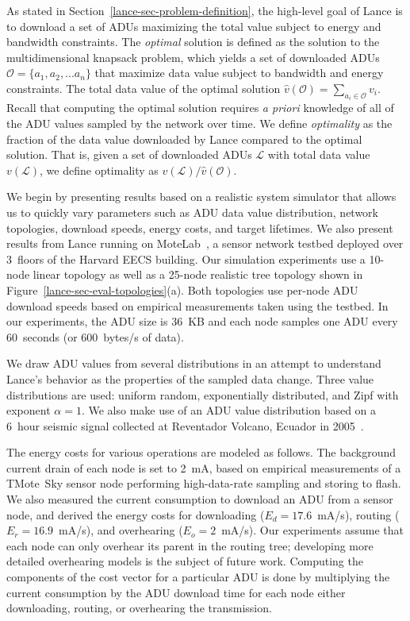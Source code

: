As stated in Section~\ref{lance-sec-problem-definition}, the high-level goal
of Lance is to download a set of ADUs maximizing the total value subject to
energy and bandwidth constraints. The {\em optimal} solution is defined as
the solution to the multidimensional knapsack problem, which yields a set of
downloaded ADUs $\mathcal{O} = \{a_1, a_2, ...  a_n\}$ that maximize data
value subject to bandwidth and energy constraints. The total data value of
the optimal solution $\hat{v}(\mathcal{O}) = \sum_{a_i \in \mathcal{O}} v_i$.
Recall that computing the optimal solution requires {\em a priori} knowledge
of all of the ADU values sampled by the network over time.  We define {\em
optimality} as the fraction of the data value downloaded by Lance compared to
the optimal solution. That is, given a set of downloaded ADUs $\mathcal{L}$
with total data value $v(\mathcal{L})$, we define optimality as
$v(\mathcal{L}) / \hat{v}(\mathcal{O})$.

We begin by presenting results based on a realistic system simulator that
allows us to quickly vary parameters such as ADU data value distribution,
network topologies, download speeds, energy costs, and target lifetimes. We
also present results from Lance running on MoteLab~\cite{motelab}, a sensor
network testbed deployed over 3~floors of the Harvard EECS building.  Our
simulation experiments use a 10-node linear topology as well as a 25-node
realistic tree topology shown in Figure~\ref{lance-sec-eval-topologies}(a).
Both topologies use per-node ADU download speeds based on empirical
measurements taken using the testbed.  In our experiments, the ADU size is
36~KB and each node samples one ADU every 60~seconds (or 600~bytes/s of
data).

We draw ADU values from several distributions in an attempt to understand
Lance's behavior as the properties of the sampled data change.  Three value
distributions are used: uniform random, exponentially distributed, and Zipf
with exponent $\alpha = 1$.  We also make use of an ADU value distribution
based on a 6~hour seismic signal collected at Reventador Volcano, Ecuador in
2005~\cite{volcano-osdi06}.

The energy costs for various operations are modeled as follows.  The
background current drain of each node is set to 2~mA, based on empirical
measurements of a TMote~Sky sensor node performing high-data-rate sampling
and storing to flash.  We also measured the current consumption to download
an ADU from a sensor node, and derived the energy costs for downloading ($E_d
= 17.6$~mA/s), routing ($E_r = 16.9$~mA/s), and overhearing ($E_o = 2$~mA/s).
Our experiments assume that each node can only overhear its parent in the
routing tree; developing more detailed overhearing models is the subject of
future work.  Computing the components of the cost vector for a particular
ADU is done by multiplying the current consumption by the ADU download time
for each node either downloading, routing, or overhearing the transmission.

